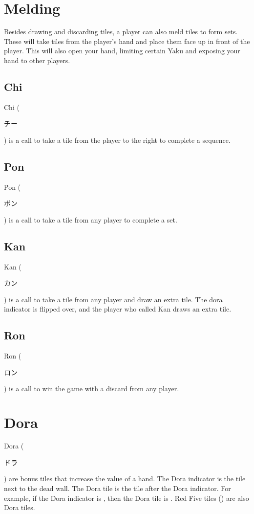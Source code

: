 \documentclass[8pt,landscape]{article}
\begin{document}
\begin{minipage}[t][.8\textheight][t]{\textwidth}
\begin{multicols*}{3}
    \section{Melding}
    Besides drawing and discarding tiles, a player can also meld tiles to form sets.
    These will take tiles from the player's hand and place them face up in front of the player.
    This will also open your hand, limiting certain Yaku and exposing your hand to other players.
    \subsection{Chi}
    Chi (\begin{CJK}{UTF8}{min}チー\end{CJK}) is a call to take a tile from the player to the right to complete a sequence.

    \subsection{Pon}
    Pon (\begin{CJK}{UTF8}{min}ポン\end{CJK}) is a call to take a tile from any player to complete a set.

    \subsection{Kan}
    Kan (\begin{CJK}{UTF8}{min}カン\end{CJK}) is a call to take a tile from any player and draw an extra tile.
    The dora indicator is flipped over, and the player who called Kan draws an extra tile.

    \subsection{Ron}
    Ron (\begin{CJK}{UTF8}{min}ロン\end{CJK}) is a call to win the game with a discard from any player.

    \section{Dora}
    Dora (\begin{CJK}{UTF8}{min}ドラ\end{CJK}) are bonus tiles that increase the value of a hand.
    The Dora indicator is the tile next to the dead wall.
    The Dora tile is the tile after the Dora indicator. For example, if the Dora indicator is , then the Dora tile is .
    Red Five tiles () are also Dora tiles.


\end{multicols*}
\end{minipage}
\end{document}
